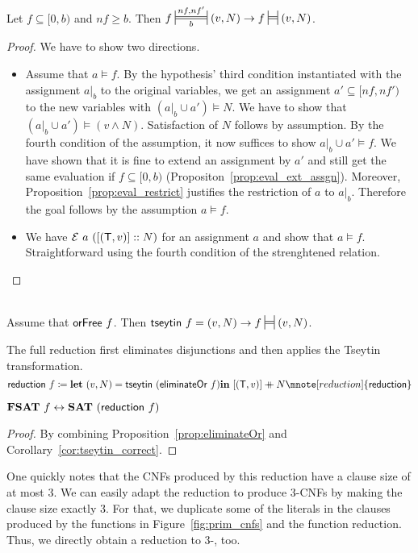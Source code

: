 \begin{proposition}
  Let $f \subseteq [0, b)$ and $nf \ge b$. 
  Then $f \Frepr{nf}{nf'}{b} (v, N) \rightarrow f \frepr{} (v, N)$. 
\end{proposition}
\begin{proof}
  We have to show two directions. 
  \begin{itemize}
    \item Assume that $a \models f$. By the hypothesis' third condition instantiated with the assignment $a|_b$ to the original variables, we get an assignment $a' \subseteq [nf, nf')$ to the new variables with $(a|_b \cup a') \models N$. We have to show that $(a|_b \cup a') \models (v \land N)$. Satisfaction of $N$ follows by assumption. By the fourth condition of the assumption, it now suffices to show $a|_b \cup a' \models f$. We have shown that it is fine to extend an assignment by $a'$ and still get the same evaluation if $f \subseteq [0, b)$ (Propositon~\ref{prop:eval_ext_assgn}).
      Moreover, Proposition~\ref{prop:eval_restrict} justifies the restriction of $a$ to $a|_b$. Therefore the goal follows by the assumption $a \models f$.
    \item We have $\mathcal{E}~a~([(\mathsf{T}, v)] :: N)$ for an assignment $a$ and show that $a \models f$. Straightforward using the fourth condition of the strenghtened relation.
  \end{itemize}
\end{proof}

\begin{corollary}\label{cor:tseytin_correct}~\\
  Assume that $\textsf{orFree}~f$. Then $\tseytin~f = (v, N) \rightarrow f \frepr{} (v, N)$. 
\end{corollary}

The full reduction first eliminates disjunctions and then applies the Tseytin transformation.
\[\textsf{reduction}~f \defeq \llet (v, N) = \tseytin~(\eliminateOr~f) \lin [(\btrue, v)] \concat N \mnote[reduction]{\textsf{reduction}}\]
\begin{lemma}
  $\textbf{FSAT}{}~f \leftrightarrow \textbf{SAT}{}~(\textsf{reduction}~f)$
\end{lemma}
\begin{proof}
  By combining Proposition~\ref{prop:eliminateOr} and Corollary~\ref{cor:tseytin_correct}.
\end{proof}

One quickly notes that the CNFs produced by this reduction have a clause size of at most 3. We can easily adapt the reduction to produce 3-CNFs by making the clause size exactly 3. For that, we duplicate some of the literals in the clauses produced by the functions in Figure~\ref{fig:prim_cnfs} and the function \textsf{reduction}.
Thus, we directly obtain a reduction to 3-\SAT{}, too.

